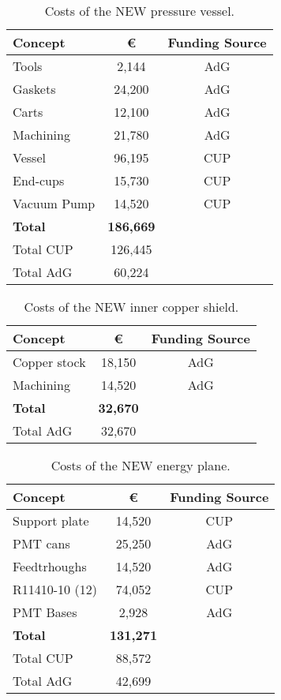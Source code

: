 \begin{table}[h!]
\begin{center}
\begin{tabular}{|l|c|c|}
\hline
 Concept & \euro & Funding Source \\
 \hline
 Tools &	2,144 &	AdG \\
Gaskets & 24,200 &	AdG \\
Carts	& 12,100 &	AdG\\
Machining	 & 21,780 & 	AdG\\
Vessel	& 96,195 &	CUP \\
End-cups	& 15,730 &	CUP \\
Vacuum Pump	& 14,520 & CUP \\
 \hline
{\bf Total}	& {\bf186,669 }& \\	
Total CUP	& 126,445 & \\	
Total AdG	& 60,224 & \\	
 \hline\hline
\end{tabular}  
\caption{Costs of the NEW pressure vessel.}
\label{tab.new:PV}
\end{center}
\end{table} 

\begin{table}[h!]
\begin{center}
\begin{tabular}{|l|c|c|}
\hline
 Concept & \euro & Funding Source \\
 \hline
 Copper stock &	18,150 &	AdG \\
Machining & 14,520 &	AdG \\
 \hline
{\bf Total} &	{\bf 32,670} & \\		
Total AdG	& 32,670 & \\	
 \hline\hline
\end{tabular}  
\caption{Costs of the NEW inner copper shield.}
\label{tab.new:ICS}
\end{center}
\end{table} 

\begin{table}[h!]
\begin{center}
\begin{tabular}{|l|c|c|}
\hline
 Concept & \euro & Funding Source \\
 \hline
Support plate	&	14,520 &	CUP \\
PMT cans &	25,250 &	AdG\\
Feedtrhoughs &	14,520 &	AdG \\
R11410-10 (12) &	74,052 &	CUP \\
PMT Bases &		 2,928 &	AdG\\
  \hline
{\bf Total}	&	{\bf 131,271}	& \\
Total CUP	&	88,572	&\\
Total AdG	&	42,699 & \\	
 \hline\hline
\end{tabular}  
\caption{Costs of the NEW energy plane.}
\label{tab.new:EP}
\end{center}
\end{table}

